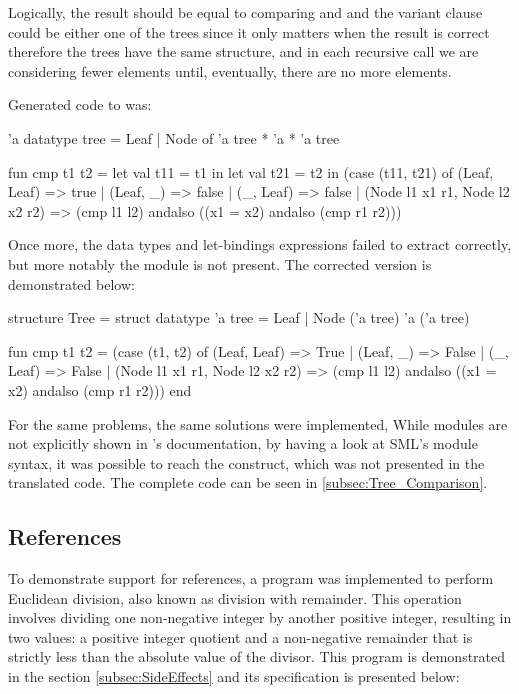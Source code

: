 Logically, the result should be equal to comparing  and  and the variant clause could be either one of 
the trees since it only matters when the result is correct therefore the trees have the same structure, and in each recursive call we
are considering fewer elements until, eventually, there are no more elements.

Generated code to \cml was:

\begin{cakeml}
'a datatype tree = Leaf | Node of 'a tree * 'a * 'a tree

fun cmp t1 t2 = let val t11 = t1 in
  let val t21 = t2 in
  (case (t11, t21) of
    (Leaf, Leaf) => true
  | (Leaf, _) => false
  | (_, Leaf) => false
  | (Node l1 x1 r1, Node l2 x2 r2) =>
    (cmp l1 l2) andalso ((x1 = x2) andalso (cmp r1 r2)))
\end{cakeml}

Once more, the data types and let-bindings expressions failed to extract correctly, but more notably the module is not present.
The corrected version is demonstrated below:

\begin{cakeml}
structure Tree = struct
  datatype 'a tree = Leaf | Node ('a tree) 'a ('a tree)

  fun cmp t1 t2 =
  (case (t1, t2) of
    (Leaf, Leaf) => True
  | (Leaf, _) => False
  | (_, Leaf) => False
  | (Node l1 x1 r1, Node l2 x2 r2) =>
      (cmp l1 l2) andalso ((x1 = x2) andalso (cmp r1 r2)))
end
\end{cakeml}

For the same problems, the same solutions were implemented, While modules are not explicitly shown
in \cml's documentation, by having a look at SML's module syntax, it was possible to reach the 
 construct, which was not presented in the translated code.
The complete code can be seen in \ref{subsec:Tree_Comparison}.

\subsection{References}

To demonstrate support for references, a program was implemented to perform Euclidean division, also known as division with remainder. 
This operation involves dividing one non-negative integer by another positive integer, resulting in two values: a positive integer 
quotient and a non-negative remainder that is strictly less than the absolute value of the divisor. This program is demonstrated 
in the section \ref{subsec:SideEffects} and its specification is presented below:

